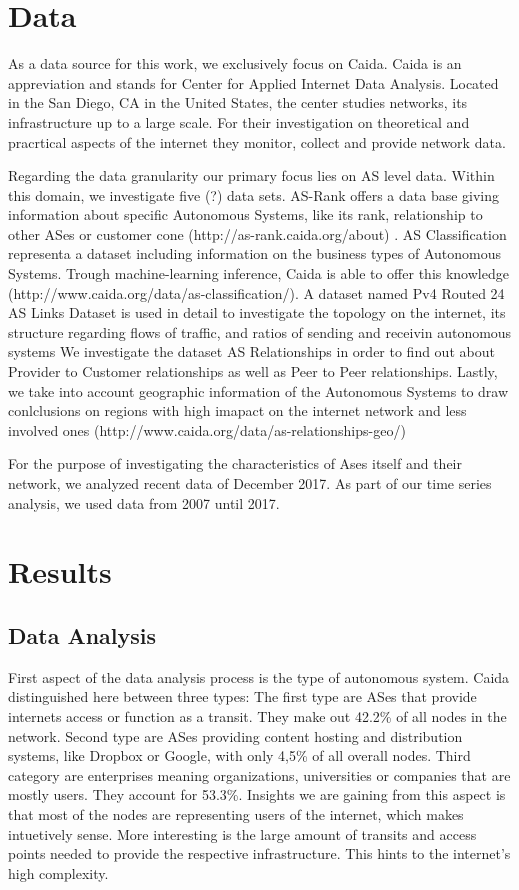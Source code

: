 \documentclass[conference]{IEEEtran}
\begin{document}
\section{Data}
As a data source for this work, we exclusively focus on Caida. Caida is an appreviation and stands for Center for Applied Internet Data Analysis. Located in the San Diego, CA in the United States, the center studies networks, its infrastructure up to a large scale. For their investigation on theoretical and pracrtical aspects of the internet they monitor, collect and provide network data. 

Regarding the data granularity our primary focus lies on AS level data. Within this domain, we investigate five (?) data sets. AS-Rank offers a data base giving information about specific Autonomous Systems, like its rank, relationship to other ASes or customer cone (http://as-rank.caida.org/about) . AS Classification representa a dataset including information on the business types of Autonomous Systems. Trough machine-learning inference, Caida is able to offer this knowledge (http://www.caida.org/data/as-classification/). A dataset named Pv4 Routed 24 AS Links Dataset is used in detail to investigate the topology on the internet, its structure regarding flows of traffic, and ratios of sending and receivin autonomous systems %
We investigate the dataset AS Relationships in order to find out about Provider to Customer relationships as well as Peer to Peer relationships.  Lastly, we take into account geographic information of the Autonomous Systems to draw conlclusions on regions with high imapact on the internet network and less involved ones (http://www.caida.org/data/as-relationships-geo/)


For the purpose of investigating the characteristics of Ases itself and their network, we analyzed recent data of December 2017.  As part of our time series analysis, we used data from 2007 until 2017. 


\section{Results}

\subsection{Data Analysis}
First aspect of the data analysis process is the type of autonomous system. Caida distinguished here between three types: The first type are ASes that provide internets access or function as a transit. They make out 42.2\% of all nodes in the network. Second type are ASes providing content hosting and distribution systems, like Dropbox or Google, with only 4,5\% of all overall nodes. Third category are enterprises meaning organizations, universities or companies that are mostly users. They account for 53.3\%. Insights we are gaining from this aspect is that most of the nodes are representing users of the internet, which makes intuetively sense. More interesting is the large amount of transits and access points needed to provide the respective infrastructure. This hints to the internet's high complexity. 
\end{document}
